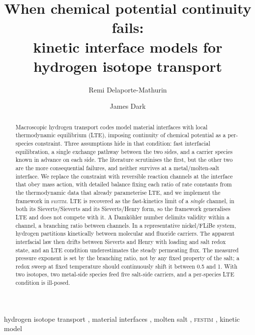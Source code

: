 \documentclass[5p]{elsarticle}
\newcommand{\FESTIM}{\textsc{festim}}
\begin{document}
\begin{frontmatter}

\title{When chemical potential continuity fails:\\
       kinetic interface models for hydrogen isotope transport}

\author[mit]{Remi Delaporte-Mathurin}
\author[mit]{James Dark}

\address[mit]{Massachusetts Institute of Technology, Cambridge, MA, USA}

\begin{abstract}
Macroscopic hydrogen transport codes model material interfaces with local thermodynamic equilibrium (LTE), imposing continuity of chemical potential as a per-species constraint. 
Three assumptions hide in that condition: fast interfacial equilibration, a single exchange pathway between the two sides, and a carrier species known in advance on each side.
The literature scrutinises the first, but the other two are the more consequential failures, and neither survives at a metal/molten-salt interface. 
We replace the constraint with reversible reaction channels at the interface that obey mass action, with detailed balance fixing each ratio of rate constants from the thermodynamic data that already parameterise LTE, and we implement the framework in \FESTIM{}.
LTE is recovered as the fast-kinetics limit of a \emph{single} channel, in both its Sieverts/Sieverts and its Sieverts/Henry form, so the framework generalises LTE and does not compete with it.
A Damk\"ohler number delimits validity within a channel, a branching ratio between channels.
In a representative nickel/FLiBe system, hydrogen partitions kinetically between molecular and fluoride carriers.
The apparent interfacial law then drifts between Sieverts and Henry with loading and salt redox state, and an LTE condition underestimates the steady permeating flux.
The measured pressure exponent is set by the branching ratio, not by any fixed property of the salt; a redox sweep at fixed temperature should continuously shift it between 0.5 and 1.
With two isotopes, two metal-side species feed five salt-side carriers, and a per-species LTE condition is ill-posed.
\end{abstract}

\begin{keyword}
    hydrogen isotope transport \sep
    material interfaces \sep
    molten salt \sep
    \FESTIM{} \sep
    kinetic model
\end{keyword}

\end{frontmatter}
\end{document}
